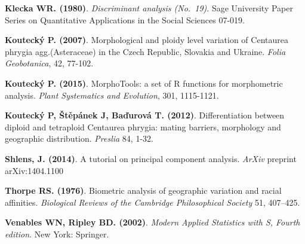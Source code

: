 \documentclass[
]{article}
\begin{document}
\textbf{Klecka WR. (1980)}. \emph{Discriminant analysis (No.~19)}. Sage
University Paper Series on Quantitative Applications in the Social
Sciences 07-019.

\textbf{Koutecký P. (2007)}. Morphological and ploidy level variation of
Centaurea phrygia agg.(Asteraceae) in the Czech Republic, Slovakia and
Ukraine. \emph{Folia Geobotanica}, 42, 77-102.

\textbf{Koutecký P. (2015)}. MorphoTools: a set of R functions for
morphometric analysis. \emph{Plant Systematics and Evolution}, 301,
1115-1121.

\textbf{Koutecký P, Štěpánek J, Baďurová T. (2012)}. Differentiation
between diploid and tetraploid Centaurea phrygia: mating barriers,
morphology and geographic distribution. \emph{Preslia} 84, 1-32.

\textbf{Shlens, J. (2014)}. A tutorial on principal component analysis.
\emph{ArXiv} preprint arXiv:1404.1100

\textbf{Thorpe RS. (1976)}. Biometric analysis of geographic variation
and racial affinities. \emph{Biological Reviews of the Cambridge
Philosophical Society} 51, 407--425.

\textbf{Venables WN, Ripley BD. (2002)}. \emph{Modern Applied Statistics
with S, Fourth edition}. New York: Springer.
\end{document}
